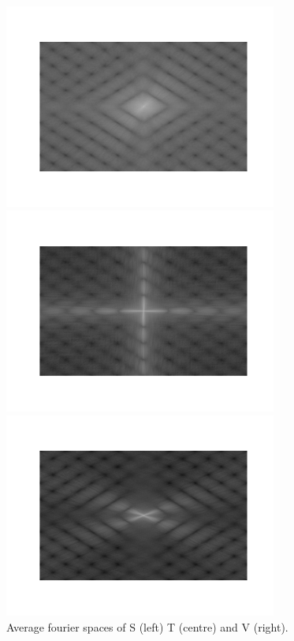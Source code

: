 \documentclass[11pt, a4paper]{article}
\begin{document}
\begin{figure}[ht]
\centering
	\begin{minipage}[b]{0.3\textwidth}
		\includegraphics[trim={2cm 2cm 2cm 2cm},clip,width=0.8\textwidth]{characters/S_average.png}
	\end{minipage}	
	\begin{minipage}[b]{0.3\textwidth}
		\includegraphics[trim={2cm 2cm 2cm 2cm},clip,width=0.8\textwidth]{characters/T_average.png}
	\end{minipage}
	\begin{minipage}[b]{0.3\textwidth}
		\includegraphics[trim={2cm 2cm 2cm 2cm},clip,width=0.8\textwidth]{characters/V_average.png}
	\end{minipage}
	\caption{Average fourier spaces of S (left) T (centre) and V (right).}
	\label{fig:averages}
\end{figure}
\end{document}
